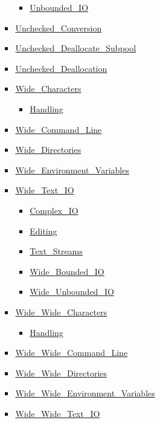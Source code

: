 \begin{multicols*}{\columnnr}
\begin{scriptsize}
\begin{itemize}[leftmargin=0mm]
\begin{itemize}[leftmargin=5mm]
\begin{itemize}[leftmargin=5mm]
\begin{itemize}[leftmargin=5mm]
	  \item[] \href{\adarmlink{RM-A-10-12.html}}{Unbounded\_IO}
	  \end{itemize}
	\item[] \href{\adarmlink{RM-13-9.html}}{Unchecked\_Conversion}
	\item[] \href{\adarmlink{RM-13-11-5.html}}{Unchecked\_Deallocate\_Subpool}
	\item[] \href{\adarmlink{RM-13-11-2.html}}{Unchecked\_Deallocation}
	\item[] \href{\adarmlink{RM-A-3-1.html}}{Wide\_Characters}
	  \begin{itemize}[leftmargin=5mm]
	  \item[] \href{\adarmlink{RM-A-3-5.html}}{Handling}
	  \end{itemize}
	\item[] \href{\adarmlink{RM-A-15-1.html}}{Wide\_Command\_Line}
	\item[] \href{\adarmlink{RM-A-16-2.html}}{Wide\_Directories}
	\item[] \href{\adarmlink{RM-A-17-1.html}}{Wide\_Environment\_Variables}
	\item[] \href{\adarmlink{RM-A-11.html}}{Wide\_Text\_IO}
	  \begin{itemize}[leftmargin=5mm]
	  \item[] \href{\adarmlink{RM-G-1-4.html}}{Complex\_IO}
	  \item[] \href{\adarmlink{RM-F-3-4.html}}{Editing}
	  \item[] \href{\adarmlink{RM-A-12-3.html}}{Text\_Streams}
	  \item[] \href{\adarmlink{RM-A-11.html}}{Wide\_Bounded\_IO}
	  \item[] \href{\adarmlink{RM-A-11.html}}{Wide\_Unbounded\_IO}
	  \end{itemize}
	\item[] \href{\adarmlink{RM-A-3-1.html}}{Wide\_Wide\_Characters}
	  \begin{itemize}[leftmargin=5mm]
	  \item[] \href{\adarmlink{RM-A-3-6.html}}{Handling}
	  \end{itemize}
	\item[] \href{\adarmlink{RM-A-15-1.html}}{Wide\_Wide\_Command\_Line}
	\item[] \href{\adarmlink{RM-A-16-2.html}}{Wide\_Wide\_Directories}
	\item[] \href{\adarmlink{RM-A-17-1.html}}{Wide\_Wide\_Environment\_Variables}
	\item[] \href{\adarmlink{RM-A-11.html}}{Wide\_Wide\_Text\_IO}

\end{itemize}
\end{itemize}
\end{itemize}
\end{scriptsize}
\end{multicols*}
